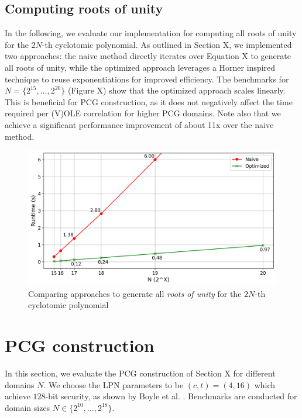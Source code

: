\subsection{Computing roots of unity}
In the following, we evaluate our implementation for computing all roots of unity for the $2N$-th cyclotomic polynomial. As outlined in Section X, we implemented two approaches: the naive method directly iterates over Equation X to generate all roots of unity, while the optimized approach leverages a Horner inspired technique to reuse exponentiations for improved efficiency. The benchmarks for $N=\{2^{15}, ..., 2^{20}\}$ (Figure X) show that the optimized approach scales linearly. This is beneficial for PCG construction, as it does not negatively affect the time required per (V)OLE correlation for higher PCG domains. Note also that we achieve a significant performance improvement of about 11x over the naive method.

\begin{figure}[h!]
    \centering
    \includegraphics[scale=0.49]{images/plots/gen_roots.png}
    \caption{Comparing approaches to generate all \textit{roots of unity} for the $2N$-th cyclotomic polynomial}
\end{figure}


\section{PCG construction}
In this section, we evaluate the PCG construction of Section X for different domains $N$. We choose the LPN parameters to be $(c,t)=(4,16)$ which achieve $128$-bit security, as shown by Boyle et al. \cite{boyle2020efficient}. Benchmarks are conducted for domain sizes $N\in\{2^{10}, ..., 2^{18}\}$. 


